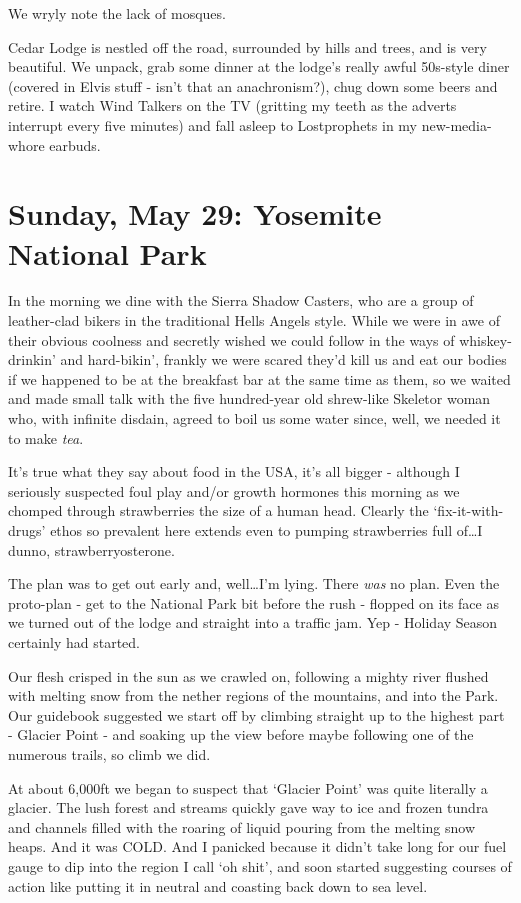 \documentclass[a5paper,titlepage,draft]{book}
\begin{document}
We wryly note the lack of mosques.

Cedar Lodge is nestled off the road, surrounded by hills and trees, and is very beautiful.  We unpack, grab some dinner at the lodge's really awful 50s-style diner (covered in Elvis stuff - isn't that an anachronism?), chug down some beers and retire.  I watch Wind Talkers on the TV (gritting my teeth as the adverts interrupt every five minutes) and fall asleep to Lostprophets in my new-media-whore earbuds.

\chapter[Yosemite National Park]{Sunday, May 29: Yosemite National Park}
In the morning we dine with the Sierra Shadow Casters, who are a group of leather-clad bikers in the traditional Hells Angels style.  While we were in awe of their obvious coolness and secretly wished we could follow in the ways of whiskey-drinkin' and hard-bikin', frankly we were scared they'd kill us and eat our bodies if we happened to be at the breakfast bar at the same time as them, so we waited and made small talk with the five hundred-year old shrew-like Skeletor woman who, with infinite disdain, agreed to boil us some water since, well, we needed it to make \emph{tea}.

It's true what they say about food in the USA, it's all bigger - although I seriously suspected foul play and/or growth hormones this morning as we chomped through strawberries the size of a human head.  Clearly the `fix-it-with-drugs' ethos so prevalent here extends even to pumping strawberries full of\ldots I dunno, strawberryosterone.

The plan was to get out early and, well\ldots I'm lying.  There \emph{was} no plan.  Even the proto-plan - get to the National Park bit before the rush - flopped on its face as we turned out of the lodge and straight into a traffic jam.  Yep - Holiday Season certainly had started.

Our flesh crisped in the sun as we crawled on, following a mighty river flushed with melting snow from the nether regions of the mountains, and into the Park.  Our guidebook suggested we start off by climbing straight up to the highest part - Glacier Point - and soaking up the view before maybe following one of the numerous trails, so climb we did.

At about 6,000ft we began to suspect that `Glacier Point' was quite literally a glacier.  The lush forest and streams quickly gave way to ice and frozen tundra and channels filled with the roaring of liquid pouring from the melting snow heaps.  And it was COLD.   And I panicked because it didn't take long for our fuel gauge to dip into the region I call `oh shit', and soon started suggesting courses of action like putting it in neutral and coasting back down to sea level.
\end{document}
